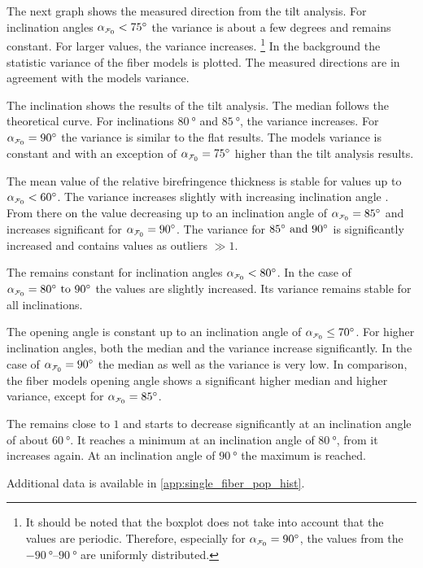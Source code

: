 \par
%
The next graph shows the measured direction from the tilt analysis.
For inclination angles $\modelInc<\SI{75}{\degree}$ the variance is about a few degrees and remains constant.
For larger values, the variance increases.
\footnote{It should be noted that the boxplot does not take into account that the values are periodic.
Therefore, especially for $\modelInc=\SI{90}{\degree}$, the values from the $\SIrange{-90}{90}{\degree}$ are uniformly distributed.}
In the background the statistic \bvariance{} variance of the fiber models is plotted.
The measured directions are in agreement with the models variance.
\par
%
The inclination shows the results of the tilt analysis.
The median follows the theoretical curve.
For inclinations $\SI{80}{\degree}$ and $\SI{85}{\degree}$, the variance increases.
For $\modelInc = \SI{90}{\degree}$ the variance is similar to the flat results.
The models \bvariance{} variance is constant and with an exception of $\modelInc=\SI{75}{\degree}$ higher than the tilt analysis results.
\par
%
The mean value of the relative birefringence thickness \trel{} is stable for values up to $\modelInc < \SI{60}{\degree}$.
The variance increases slightly with increasing inclination angle \modelInc{}.
From there on the \trel{} value decreasing up to an inclination angle of $\modelInc=\SI{85}{\degree}$ and increases significant for $\modelInc = \SI{90}{\degree}$.
The variance for $\SIlist{85;90}{\degree}$ is significantly increased and contains values as outliers $\gg 1$.
\par
%
The \rvalue{} remains constant for inclination angles $\modelInc < \SI{80}{\degree}$.
In the case of $\modelInc=\SIrange[]{80}{90}{\degree}$ the values are slightly increased.
Its variance remains stable for all inclinations.
\par
%
The opening angle \openingAngle{} is constant up to an inclination angle of $\modelInc \le \SI{70}{\degree}$.
For higher inclination angles, both the median and the variance increase significantly.
In the case of $\modelInc = \SI{90}{\degree}$ the median as well as the variance is very low.
In comparison, the fiber models opening angle \openingAngle{} shows a significant higher median and higher \bvariance{} variance, except for $\modelInc=\SI{85}{\degree}$.
\par
%
The \accvalue{} remains close to $1$ and starts to decrease significantly at an inclination angle of about $\SI{60}{\degree}$.
It reaches a minimum at an inclination angle of $\SI{80}{\degree}$, from it increases again.
At an inclination angle of $\SI{90}{\degree}$ the maximum \accvalue{} is reached.
\par
% 
Additional data is available in \cref{app:single_fiber_pop_hist}.
%
%
%
